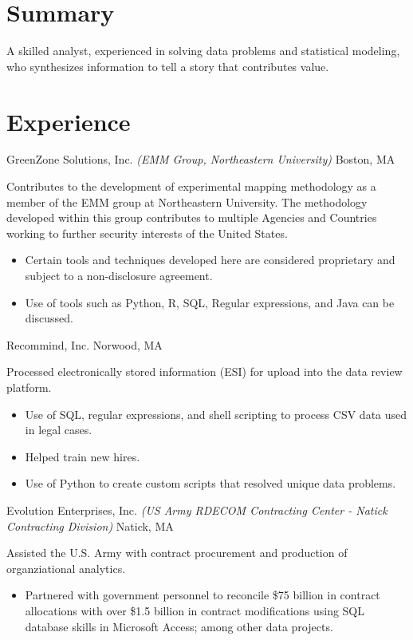 \documentclass[10pt,a4paper]{moderncv}
\begin{document}
\makecvtitle
\section{Summary}
{A skilled analyst, experienced in solving data problems and statistical
  modeling, who synthesizes information to tell a story that contributes
  value.}
\section{Experience}
         {GreenZone Solutions, Inc.}
         {\textit{(EMM Group, Northeastern University)} Boston, MA}
         {}{Contributes to the development of experimental
           mapping methodology as a member of the EMM group at
           Northeastern University. The methodology developed within
           this group contributes to multiple Agencies and Countries
           working to further security interests of the United States.
           \newline
           \begin{itemize}
           \item Certain tools and techniques developed here are
             considered proprietary and subject to a non-disclosure
             agreement.
           \item Use of tools such as Python, R, SQL, Regular
             expressions, and Java can be discussed.
           \end{itemize}
         }

         {Recommind, Inc.}
         {Norwood, MA}
         {}{Processed electronically stored information (ESI) for
           upload into the data review platform.
           \newline
           \begin{itemize}
           \item Use of SQL, regular expressions, and shell scripting
             to process CSV data used in legal cases.
           \item Helped train new hires.
           \item Use of Python to create custom scripts that resolved
             unique data problems.
           \end{itemize}}

         {Evolution Enterprises, Inc.}
         {\textit{(US Army RDECOM Contracting Center - Natick Contracting Division)} Natick, MA}
         {}{Assisted the U.S. Army with contract procurement and
           production of organziational analytics.
           \newline
           \begin{itemize}
           \item Partnered with government personnel to reconcile
             \$75 billion in contract allocations with over \$1.5
             billion in contract modifications using SQL database
             skills in Microsoft Access; among other data projects.
         \end{itemize}}
\end{document}
